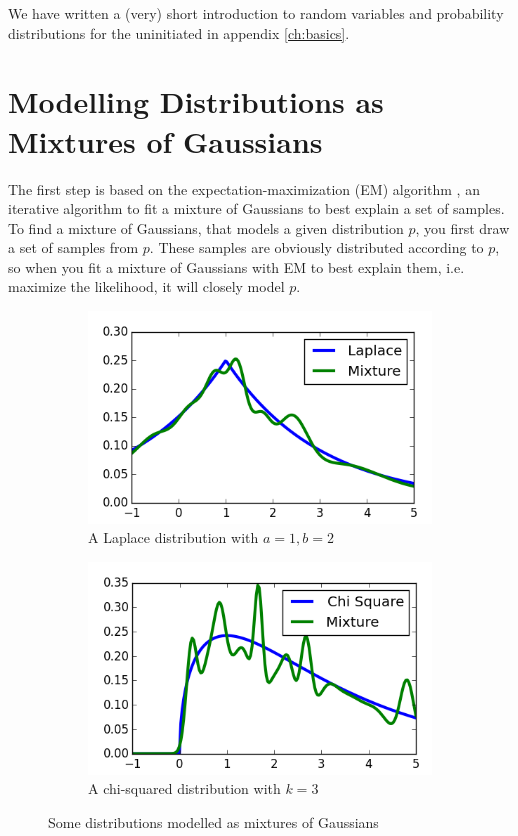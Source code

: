 \documentclass[11pt,a4paper]{book}
\begin{document}
We have written a (very) short introduction to random variables and probability
distributions for the uninitiated in appendix \ref{ch:basics}.

\section{Modelling Distributions as Mixtures of Gaussians}
\label{sec:em}

The first step is based on the expectation-maximization (EM) algorithm
\cite[chapter~11.4.2]{murphy}, an iterative algorithm to fit a mixture of
Gaussians to best explain a set of samples. To find a mixture of Gaussians, that
models a given distribution $p$, you first draw a set of samples from $p$. These
samples are obviously distributed according to $p$, so when you fit a mixture of
Gaussians with EM to best explain them, i.e. maximize the likelihood, it will
closely model $p$.

\begin{figure}[h]
  \centering
  \begin{subfigure}{0.45\textwidth}
    \centering
    \includegraphics[width=\textwidth]{thesis/theory/em-laplace}
    \caption{A Laplace distribution with $a = 1, b = 2$}
  \end{subfigure}
  \hfill
  \begin{subfigure}{0.45\textwidth}
    \centering
    \includegraphics[width=\textwidth]{thesis/theory/em-chisq}
    \caption{A chi-squared distribution with $k = 3$}
  \end{subfigure}
  \caption{Some distributions modelled as mixtures of Gaussians}
  \label{fig:theory-em}
\end{figure}
\end{document}
